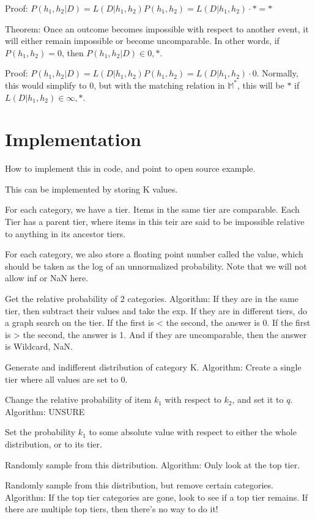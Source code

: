 \documentclass[twoside]{article}
\begin{document}
Proof: \(P(h_1, h_2|D) = L(D|h_1, h_2) P(h_1, h_2) = L(D|h_1, h_2) \cdot \ast = \ast\)

Theorem: Once an outcome becomes impossible with respect to another event, it will either remain impossible or become uncomparable. In other words,  if \(P(h_1, h_2)=0\), then \(P(h_1, h_2|D) \in {0, \ast}\).

Proof: \(P(h_1, h_2|D) = L(D|h_1, h_2) P(h_1, h_2) = L(D|h_1, h_2) \cdot 0\). Normally, this would simplify to 0, but with the matching relation in \(\mathbb{M}^*\), this will be \(\ast\) if \(L(D|h_1, h_2) \in {\infty, \ast}\).

\section{Implementation}

How to implement this in code, and point to open source example.

This can be implemented by storing K values.

For each category, we have a tier. Items in the same tier are comparable. Each Tier has a parent tier, where items in this teir are said to be impossible relative to anything in its ancestor tiers.

For each category, we also store a floating point number called the value, which should be taken as the log of an unnormalized probability. Note that we will not allow inf or NaN here.

Get the relative probability of 2 categories. Algorithm: If they are in the same tier, then subtract their values and take the exp. If they are in different tiers, do a graph search on the tier. If the first is < the second, the answer is 0. If the first is > the second, the answer is 1. And if they are uncomparable, then the answer is Wildcard, NaN.

Generate and indifferent distribution of category K. Algorithm: Create a single tier where all values are set to 0.

Change the relative probability of item \(k_1\) with respect to \(k_2\), and set it to \(q\). Algorithm: UNSURE

Set the probability \(k_1\) to some absolute value with respect to either the whole distribution, or to its tier.

Randomly sample from this distribution. Algorithm: Only look at the top tier.

Randomly sample from this distribution, but remove certain categories. Algorithm: If the top tier categories are gone, look to see if a top tier remains. If there are multiple top tiers, then there's no way to do it!
\end{document}
